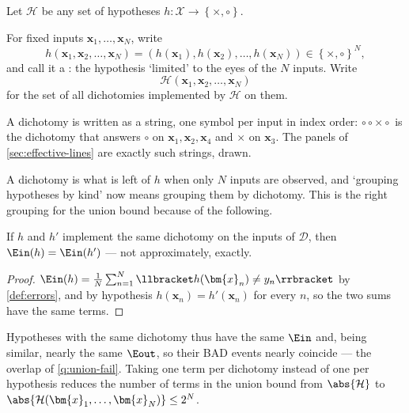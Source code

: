 Let \(\mathcal{H}\) be any set of hypotheses \(h \colon \mathcal{X} \to
\left\{ \times, \circ \right\}\).

\begin{definition}[Dichotomy]\label{def:dichotomy}
    For fixed inputs \(\bm{x}_1, \dots , \bm{x}_N\), write
    \[
        h(\bm{x}_1, \bm{x}_2, \dots , \bm{x}_N)
        = \left( h(\bm{x}_1), h(\bm{x}_2), \dots , h(\bm{x}_N) \right)
        \in \left\{ \times, \circ \right\}^N ,
    \]
    and call it a : the hypothesis `limited' to the eyes of the
    \(N\) inputs. Write
    \[
        \mathcal{H}(\bm{x}_1, \bm{x}_2, \dots , \bm{x}_N)
    \]
    for the set of all dichotomies implemented by \(\mathcal{H}\) on them.
\end{definition}

\begin{notation}
    A dichotomy is written as a string, one symbol per input in index order:
    \(\circ\circ\times\circ\) is the dichotomy that answers \(\circ\) on
    \(\bm{x}_1, \bm{x}_2, \bm{x}_4\) and \(\times\) on \(\bm{x}_3\). The panels
    of \autoref{sec:effective-lines} are exactly such strings, drawn.
\end{notation}

A dichotomy is what is left of \(h\) when only \(N\) inputs are observed, and
`grouping hypotheses by kind' now means grouping them by dichotomy. This is the
right grouping for the union bound because of the following.

\begin{lemma}\label{lem:same-ein}
    If \(h\) and \(h'\) implement the same dichotomy on the inputs of
    \(\mathcal{D}\), then \(\Ein(h) = \Ein(h')\) --- not approximately, exactly.
\end{lemma}

\begin{proof}
    \(\Ein(h) = \frac{1}{N} \sum_{n=1}^{N}
    \llbracket h(\bm{x}_n) \neq y_n \rrbracket\) by \autoref{def:errors},
    and by hypothesis \(h(\bm{x}_n) = h'(\bm{x}_n)\) for every \(n\), so the two
    sums have the same terms.
\end{proof}

Hypotheses with the same dichotomy thus have the same \(\Ein\) and, being
similar, nearly the same \(\Eout\), so their BAD events nearly coincide --- the
overlap of \autoref{q:union-fail}. Taking one term per dichotomy instead of one
per hypothesis reduces the number of terms in the union bound from
\(\abs{\mathcal{H}}\) to \(\abs{\mathcal{H}(\bm{x}_1, \dots , \bm{x}_N)}
\le 2^N\).

